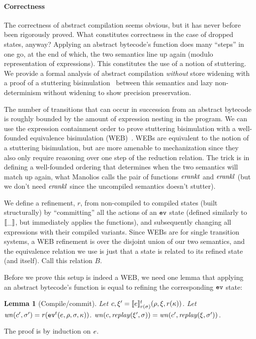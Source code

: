\documentclass[9pt]{sigplanconf} %
\newtheorem{lemma}{Lemma}
\begin{document}
\paragraph{Correctness}
The correctness of abstract compilation seems obvious, but it has never before been rigorously proved.
%
What constitutes correctness in the case of dropped states, anyway?
%
Applying an abstract bytecode's function does many ``steps'' in one go, at the end of which, the two semantics line up again (modulo representation of expressions).
%
 This constitutes the use of a notion of stuttering.
%
 We provide a formal analysis of abstract compilation \emph{without} store widening with a proof of a stuttering bisimulation~\cite{ianjohnson:BCG88} between this semantics and lazy non-determinism without widening to show precision preservation.

The number of transitions that can occur in succession from an abstract bytecode is roughly bounded by the amount of expression nesting in the program.
%
We can use the expression containment order to prove stuttering bisimulation with a well-founded equivalence bisimulation (WEB)~\cite{ianjohnson:manolios-diss}.
%
 WEBs are equivalent to the notion of a stuttering bisimulation, but are more amenable to mechanization since they also only require reasoning over one step of the reduction relation.
%
The trick is in defining a well-founded ordering that determines when the two semantics will match up again, what Manolios calls the pair of functions $\erankt$ and $\erankl$ (but we don't need $\erankl$ since the uncompiled semantics doesn't stutter).

We define a refinement, $r$, from non-compiled to compiled states (built structurally) by ``committing'' all the actions of an $\evalone$ state (defined similarly to $\compile{\_}$, but immediately applies the functions), and subsequently changing all expressions with their compiled variants.
%
 Since WEBs are for single transition systems, a WEB refinement is over the disjoint union of our two semantics, and the equivalence relation we use is just that a state is related to its refined state (and itself).
%
 Call this relation $B$.

Before we prove this setup is indeed a WEB, we need one lemma that applying an abstract bytecode's function is equal to refining the corresponding $\evalone$ state:
%
\begin{lemma}[Compile/commit]
Let $c,\msdiff' = \compile{\mexp}^\mcntr_{r(\msto)}(\menv,\msdiff,r(\mkont))$.
Let $\wn(c',\msto') = r(\ev[^\mcntr]{\mexp,\menv,\msto,\mkont})$.
$\wn(c,\replay(\msdiff',\msto)) = \wn(c',\replay(\msdiff,\msto'))$.
\end{lemma}
The proof is by induction on $\mexp$.
\end{document}

